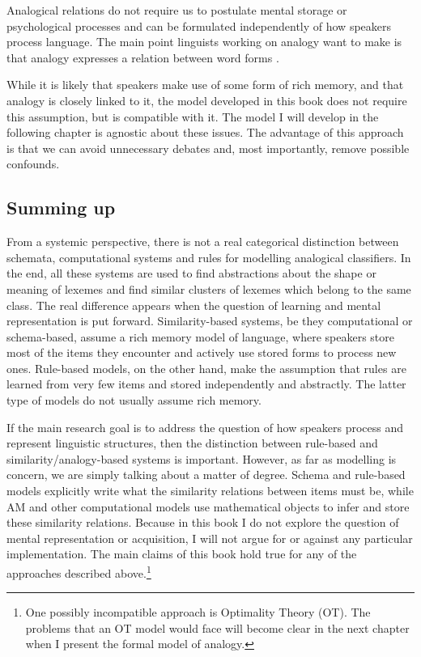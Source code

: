 Analogical relations do not require us to postulate mental storage or psychological processes and can be formulated independently of how speakers process language. The main point linguists working on analogy want to make is that analogy expresses a relation between word forms \autocite[11]{Becker.1990}.

While it is likely that speakers make use of some form of rich memory, and that analogy is closely linked to it, the model developed in this book does not require this assumption, but is compatible with it. The model I will develop in the following chapter is agnostic about these issues. The advantage of this approach is that we can avoid unnecessary debates and, most importantly, remove possible confounds.

\subsection{Summing up}

From a systemic perspective, there is not a real categorical distinction between schemata, computational systems and rules for modelling analogical classifiers. In the end, all these systems are used to find abstractions about the shape or meaning of lexemes and find similar clusters of lexemes which belong to the same class. The real difference appears when the question of learning and mental representation is put forward. Similarity-based systems, be they computational or schema-based, assume a rich memory model of language, where speakers store most of the items they encounter and actively use stored forms to process new ones. Rule-based models, on the other hand, make the assumption that rules are learned from very few items and stored independently and abstractly. The latter type of models do not usually assume rich memory.

If the main research goal is to address the question of how speakers process and represent linguistic structures, then the distinction between rule-based and similarity/analogy-based systems is important. However, as far as modelling is concern, we are simply talking about a matter of degree. Schema and rule-based  models explicitly write what the similarity relations between items must be, while AM and other computational models use mathematical objects to infer and store these similarity relations. Because in this book I do not explore the question of mental representation or acquisition, I will not argue for or against any particular implementation. The main claims of this book hold true for any of the approaches described above.\footnote{One possibly incompatible approach is Optimality Theory (OT). The problems that an OT model would face will become clear in the next chapter when I present the formal model of analogy.}

